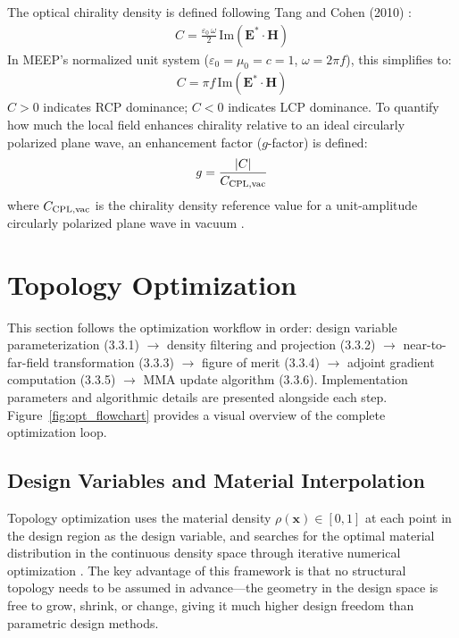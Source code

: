 The optical chirality density is defined following Tang and Cohen (2010) \cite{tang2010optical}:
\begin{align}
C = \frac{\varepsilon_0\,\omega}{2}\,\text{Im}\!\left (\mathbf{E}^{*}\cdot\mathbf{H}\right)
\end{align}
In MEEP's normalized unit system ($\varepsilon_0=\mu_0=c=1$, $\omega = 2\pi f$), this simplifies to:
\begin{align}
C = \pi f\,\text{Im}\!\left (\mathbf{E}^{*}\cdot\mathbf{H}\right)
\end{align}
$C > 0$ indicates RCP dominance; $C < 0$ indicates LCP dominance. To quantify how much the local field enhances chirality relative to an ideal circularly polarized plane wave, an enhancement factor ($g$-factor) is defined:
\begin{align}
g = \frac{|C|}{C_{{\rm CPL,vac}}}
\end{align}
where $C_{{\rm CPL,vac}}$ is the chirality density reference value for a unit-amplitude circularly polarized plane wave in vacuum \cite{hendry2010ultrasensitive}.


  

  

\section{Topology Optimization}

This section follows the optimization workflow in order: design variable parameterization (3.3.1) $\to$ density filtering and projection (3.3.2) $\to$ near-to-far-field transformation (3.3.3) $\to$ figure of merit (3.3.4) $\to$ adjoint gradient computation (3.3.5) $\to$ MMA update algorithm (3.3.6). Implementation parameters and algorithmic details are presented alongside each step. Figure~\ref{fig:opt_flowchart} provides a visual overview of the complete optimization loop.

\subsection{Design Variables and Material Interpolation}

Topology optimization uses the material density $\rho (\mathbf{x})\in[0,1]$ at each point in the design region as the design variable, and searches for the optimal material distribution in the continuous density space through iterative numerical optimization \cite{bendsøe1988generating, sigmund2013topology}. The key advantage of this framework is that no structural topology needs to be assumed in advance—the geometry in the design space is free to grow, shrink, or change, giving it much higher design freedom than parametric design methods.

